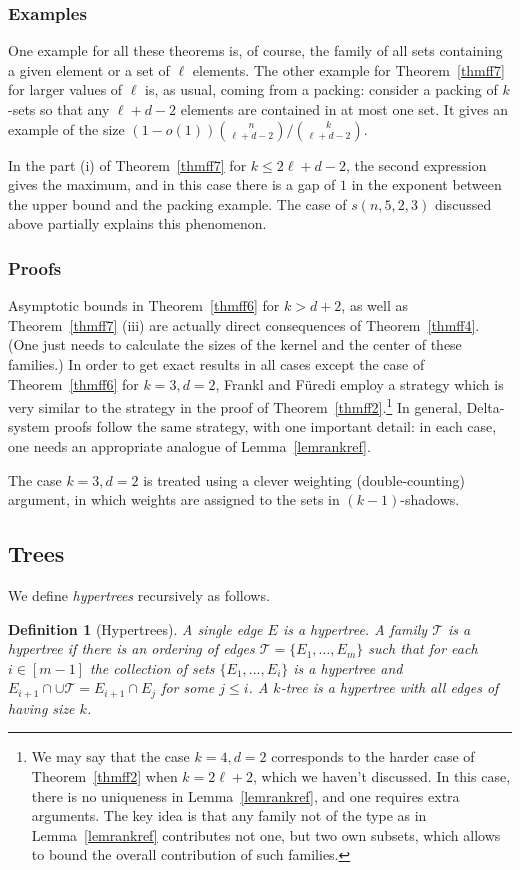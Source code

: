 \documentclass[graybox]{svmult}
\renewcommand{\le}{\leqslant}
\newcommand{\m}{\mathcal}
\newtheorem{defn}[thm]{Definition}
\begin{document}
\subsubsection{Examples} One example for all these theorems is, of course, the family of all sets containing a given element or a set of $\ell$ elements. The other example for Theorem~\ref{thmff7} for larger values of $\ell$ is, as usual, coming from a packing: consider a packing of $k$-sets so that any $\ell+d-2$ elements are contained in at most one set. It gives an example of the size $(1-o(1)){n\choose \ell+d-2}/{k\choose \ell+d-2}$.

In the part (i) of Theorem~\ref{thmff7} for $k\le 2\ell+d-2$, the second expression gives the maximum, and in this case there is a gap of $1$ in the exponent between the upper bound and the packing example. The case of $s(n,5,2,3)$ discussed above partially explains this phenomenon.

\subsubsection{Proofs}
Asymptotic bounds in Theorem~\ref{thmff6} for $k>d+2$, as well as Theorem~\ref{thmff7} (iii) are actually direct consequences of Theorem~\ref{thmff4}. (One just needs to calculate the sizes of the kernel and the center of these families.) In order to get exact results in all cases except the case of Theorem~\ref{thmff6} for $k=3,d=2$, Frankl and F\"uredi employ a strategy which is very similar to the strategy in the proof of Theorem~\ref{thmff2}.\footnote{We may say that the case $k=4,d=2$ corresponds to the harder case of Theorem~\ref{thmff2} when $k=2\ell+2$, which we haven't discussed. In this case, there is no uniqueness in Lemma~\ref{lemrankref}, and one requires extra arguments. The key idea is that any family not of the type as in Lemma~\ref{lemrankref} contributes not one, but two own subsets, which allows to bound the overall contribution of such families.}
In general, Delta-system proofs follow the same strategy, with one important detail: in each case, one needs an appropriate analogue of Lemma~\ref{lemrankref}.

The case $k=3, d=2$ is treated using a clever weighting (double-counting) argument, in which weights are assigned to the sets in $(k-1)$-shadows.



\subsection{Trees} We define {\em hypertrees} recursively as follows.
\begin{defn}[Hypertrees]\label{deft1}  A single edge $E$ is a hypertree. A family $\m T$  is a {\em hypertree} if there is an ordering of edges $\m T =\{E_1,\ldots, E_m\}$ such that for each $i\in[m-1]$ the collection of sets $\{E_1,\ldots, E_i\}$ is a hypertree and $E_{i+1}\cap \cup \m T = E_{i+1}\cap E_j$ for some $j\le i$. A {\em $k$-tree} is a hypertree with all edges of having size $k$.
\end{defn}
\end{document}
